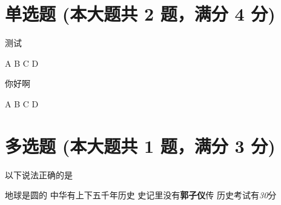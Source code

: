 \documentclass[12pt, a4paper, addpoints]{exam}
\begin{document}
\pagestyle{headandfoot}
\runningheadrule
{}

\begin{center}
\end{center}
\vspace{5mm}

\normalsize
\vspace{5mm}

\section{\normalsize{单选题 (本大题共 2 题，满分 4 分)}}
\hspace{1.5cm}
\begin{questions}
\question[2] 测试

\begin{oneparchoices}
\choice A
\choice B
\choice C
\choice D
\end{oneparchoices}

\question[2] 你好啊

\begin{oneparchoices}
\choice A
\choice B
\choice C
\choice D
\end{oneparchoices}

\end{questions}

\hspace{5cm}

\section{\normalsize{多选题 (本大题共 1 题，满分 3 分)}}
\hspace{1.5cm}
\begin{questions}
\question[3] 以下说法正确的是

\begin{checkboxes}
\choice 地球是圆的
\choice 中华有上下五千年历史
\choice 史记里没有\textbf{郭子仪}传
\choice 历史考试有\textit{30}分
\end{checkboxes}

\end{questions}
\end{document}
